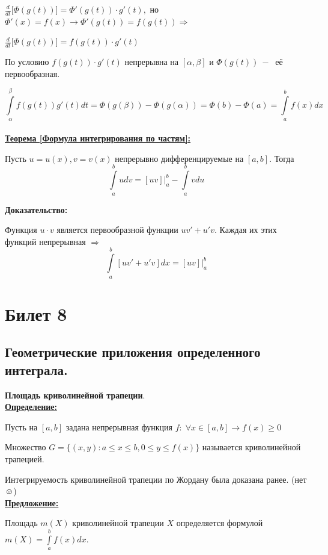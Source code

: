 \documentclass[a4paper,12pt]{article} %
\renewcommand {\geq}{\geqslant}
\renewcommand {\leq}{\leqslant}
\begin{document}
$\frac{d}{dt}\Big[\Phi(g(t))\Big]= \Phi'(g(t))\cdot g'(t),$ но $\Phi'(x) = f(x) \rightarrow \Phi'(g(t))= f(g(t))\Rightarrow$

$\frac{d}{dt}\Big[\Phi(g(t))\Big]=f(g(t))\cdot g'(t)$

По условию $f(g(t))\cdot g'(t)$ непрерывна на $[\alpha, 
\beta]$ и $\Phi(g(t))~-~$ её первообразная.

$$\int\limits_\alpha^\beta f(g(t))g'(t)dt = \Phi(g(\beta))- \Phi(g(\alpha))= \Phi(b) - \Phi(a) = \int\limits_a^b f(x)dx $$\\

\underline{\textbf{Теорема [Формула интегрирования по частям]:}}

Пусть $u = u(x), v= v(x)$ непрерывно дифференцируемые на $[a,b]$. Тогда $$\int\limits_a^b udv = [uv]|^b_a - \int\limits_a^b vdu$$

\textbf{Доказательство:}

Функция $u \cdot v$ является первообразной функции $uv'+u'v$. Каждая их этих функций непрерывная $\Rightarrow$
$$\int\limits_a^b[uv'+u'v]dx = [uv]|^b_a$$


\newpage
\section{Билет 8}

\subsection{Геометрические приложения определенного интеграла.}

\noindent \textbf{Площадь криволинейной трапеции}.\\

\underline{\textbf{Определение:}}


Пусть на $[a, b]$ задана непрерывная функция $f:\; \forall x \in[a, b] \rightarrow f(x) \geq 0$

Множество $G=\{(x,y): a\leq x \leq b, 0 \leq y \leq f(x)\}$ называется криволинейной трапецией.

Интегрируемость криволинейной трапеции по Жордану была доказана ранее. (нет $\smiley$) \\

\underline{\textbf{Предложение:}}

Площадь $m(X)$ криволинейной трапеции $X$ определяется формулой $m(X) = \int\limits_a^b f(x)dx$.\\
\end{document}
